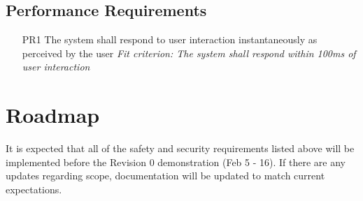 \documentclass{article}
\begin{document}
\subsection{Performance Requirements}
\begin{enumerate}
    \item[PR1] The system shall respond to user interaction instantaneously as perceived by the user\newline
    \textit{Fit criterion: The system shall respond within 100ms of user interaction}
\end{enumerate}


\section{Roadmap}

It is expected that all of the safety and security requirements listed above will be implemented before the Revision 0 demonstration (Feb 5 - 16). If there are any updates regarding scope, documentation will be updated to match current expectations.

\end{document}
